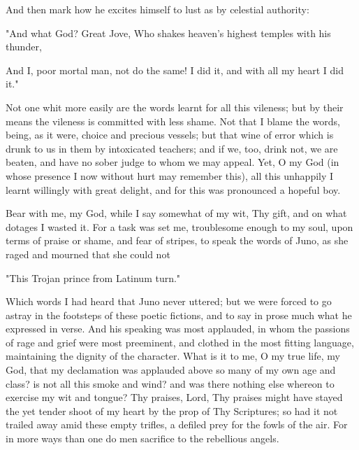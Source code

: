 \documentclass[b5paper,openright,12pt,twoside]{book}
\begin{document}
And then mark how he excites himself to lust as by celestial authority:

         "And what God?  Great Jove,
         Who shakes heaven's highest temples with his thunder,

         And I, poor mortal man, not do the same!
         I did it, and with all my heart I did it."

Not one whit more easily are the words learnt for all this vileness;
but by their means the vileness is committed with less shame. Not that
I blame the words, being, as it were, choice and precious vessels; but
that wine of error which is drunk to us in them by intoxicated teachers;
and if we, too, drink not, we are beaten, and have no sober judge to
whom we may appeal. Yet, O my God (in whose presence I now without hurt
may remember this), all this unhappily I learnt willingly with great
delight, and for this was pronounced a hopeful boy.

Bear with me, my God, while I say somewhat of my wit, Thy gift, and on
what dotages I wasted it. For a task was set me, troublesome enough to
my soul, upon terms of praise or shame, and fear of stripes, to speak
the words of Juno, as she raged and mourned that she could not

        "This Trojan prince from Latinum turn."

Which words I had heard that Juno never uttered; but we were forced to
go astray in the footsteps of these poetic fictions, and to say in prose
much what he expressed in verse. And his speaking was most applauded, in
whom the passions of rage and grief were most preeminent, and clothed
in the most fitting language, maintaining the dignity of the character.
What is it to me, O my true life, my God, that my declamation was
applauded above so many of my own age and class? is not all this smoke
and wind? and was there nothing else whereon to exercise my wit and
tongue? Thy praises, Lord, Thy praises might have stayed the yet tender
shoot of my heart by the prop of Thy Scriptures; so had it not trailed
away amid these empty trifles, a defiled prey for the fowls of the air.
For in more ways than one do men sacrifice to the rebellious angels.
\end{document}
